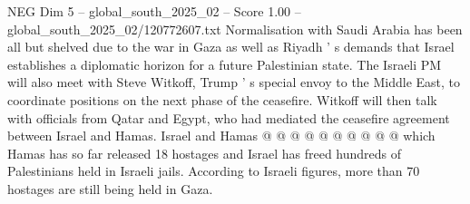 \begin{textsample}{NEG Dim 5 – global\_south\_2025\_02 – Score 1.00 – global\_south\_2025\_02/120772607.txt}
Normalisation with Saudi Arabia has been all but shelved due to the war in Gaza as well as Riyadh ' s demands that Israel establishes a diplomatic horizon for a future Palestinian state.
The Israeli PM will also meet with Steve Witkoff, Trump ' s special envoy to the Middle East, to coordinate positions on the next phase of the ceasefire.
Witkoff will then talk with officials from Qatar and Egypt, who had mediated the ceasefire agreement between Israel and Hamas.
Israel and Hamas @ @ @ @ @ @ @ @ @ @ which Hamas has so far released 18 hostages and Israel has freed hundreds of Palestinians held in Israeli jails.
According to Israeli figures, more than 70 hostages are still being held in Gaza.

\end{textsample}

